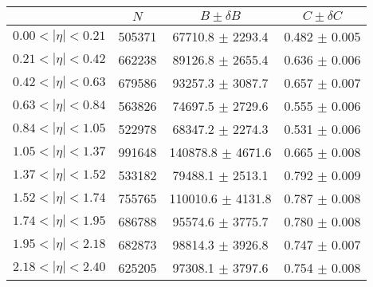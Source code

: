 \begin{tabular}{lccc}
\hline
    &   $N$   & $B \pm \delta B$  &  $C \pm \delta C$ \\
\hline
$0.00 < |\eta| <0.21$          & 505371     & 67710.8    $\pm$ 2293.4 & 0.482      $\pm$ 0.005 \\
$0.21 < |\eta| <0.42$          & 662238     & 89126.8    $\pm$ 2655.4 & 0.636      $\pm$ 0.006 \\
$0.42 < |\eta| <0.63$          & 679586     & 93257.3    $\pm$ 3087.7 & 0.657      $\pm$ 0.007 \\
$0.63 < |\eta| <0.84$          & 563826     & 74697.5    $\pm$ 2729.6 & 0.555      $\pm$ 0.006 \\
$0.84 < |\eta| <1.05$          & 522978     & 68347.2    $\pm$ 2274.3 & 0.531      $\pm$ 0.006 \\
$1.05 < |\eta| <1.37$          & 991648     & 140878.8   $\pm$ 4671.6 & 0.665      $\pm$ 0.008 \\
$1.37 < |\eta| <1.52$          & 533182     & 79488.1    $\pm$ 2513.1 & 0.792      $\pm$ 0.009 \\
$1.52 < |\eta| <1.74$          & 755765     & 110010.6   $\pm$ 4131.8 & 0.787      $\pm$ 0.008 \\
$1.74 < |\eta| <1.95$          & 686788     & 95574.6    $\pm$ 3775.7 & 0.780      $\pm$ 0.008 \\
$1.95 < |\eta| <2.18$          & 682873     & 98814.3    $\pm$ 3926.8 & 0.747      $\pm$ 0.007 \\
$2.18 < |\eta| <2.40$          & 625205     & 97308.1    $\pm$ 3797.6 & 0.754      $\pm$ 0.008 \\
\hline
\end{tabular}
